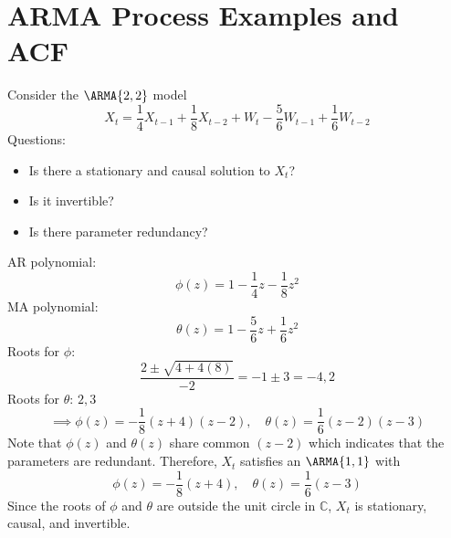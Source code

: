 \section{ARMA Process Examples and ACF}
\begin{Example}{}{}
    Consider the $ \ARMA{2,2} $ model
    \[ X_t= \frac{1}{4}X_{t-1} + \frac{1}{8} X_{t-2} + W_t - \frac{5}{6}W_{t-1} +\frac{1}{6}W_{t-2} \]
    Questions:
    \begin{itemize}
        \item Is there a stationary and causal solution to $X_t$?
        \item Is it invertible?
        \item Is there parameter redundancy?
    \end{itemize}
    AR polynomial:
    \[ \phi(z)=1-\frac{1}{4}z- \frac{1}{8}z^2  \]
    MA polynomial:
    \[ \theta(z)= 1-\frac{5}{6}z + \frac{1}{6}z^2\]
    Roots for $\phi$:
    \[ \frac{2 \pm \sqrt{4+ 4(8)}}{-2} =-1 \pm 3=-4,2 \]
    Roots for $\theta$: $ 2,3 $
    \[ \implies \phi(z)= -\frac{1}{8}(z+4)(z-2), \quad  \theta(z) = \frac{1}{6}(z-2)(z-3)\]
    Note that $\phi (z)$ and $\theta (z)$ share common $(z-2)$ which indicates
    that the parameters are redundant.
    Therefore, $X_t$ satisfies an $ \ARMA{1,1} $ with
    \[\phi(z)=-\frac{1}{8}(z+4), \quad \theta(z)= \frac{1}{6}(z-3)\]
    Since the roots of $\phi$ and $\theta$ are
    outside the unit circle in $\mathbb{C}$, $X_t$ is
    stationary, causal, and invertible.
\end{Example}
